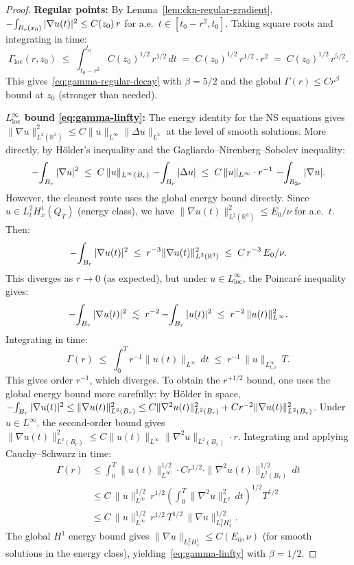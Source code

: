 \documentclass[11pt]{article}
\theoremstyle{definition}
\theoremstyle{remark}
\newcommand{\R}{\mathbb{R}}
\newcommand{\grad}{\nabla}
\newcommand{\Xint}{\mathop{\mathchoice{\vcenter{\hbox{$\displaystyle-$}}}%
  {\vcenter{\hbox{$\textstyle-$}}}%
  {\vcenter{\hbox{$\scriptstyle-$}}}%
  {\vcenter{\hbox{$\scriptscriptstyle-$}}}}\!\int}
\begin{document}
\begin{proof}
\textbf{Regular points:} By Lemma~\ref{lem:ckn-regular-gradient},
$\Xint_{B_r(x_0)} |\grad u(t)|^2 \leq C(z_0)\, r$ for a.e.\
$t \in [t_0-r^2, t_0]$.  Taking square roots and integrating in time:
\[
  \Gamma_{\mathrm{loc}}(r, z_0)
  \;\leq\; \int_{t_0-r^2}^{t_0} C(z_0)^{1/2}\, r^{1/2}\, dt
  \;=\; C(z_0)^{1/2}\, r^{1/2} \cdot r^2
  \;=\; C(z_0)^{1/2}\, r^{5/2}.
\]
This gives~\eqref{eq:gamma-regular-decay} with $\beta = 5/2$ and the global
$\Gamma(r) \leq Cr^\beta$ bound at $z_0$ (stronger than needed).

\textbf{$L^\infty_{\mathrm{loc}}$ bound \eqref{eq:gamma-linfty}:}
The energy identity for the NS equations gives
$\|\grad u\|_{L^2(\R^3)}^2 \leq C\|u\|_{L^\infty}\|\Delta u\|_{L^2}$
at the level of smooth solutions.  More directly, by H\"older's
inequality and the Gagliardo--Nirenberg--Sobolev inequality:
\[
  \Xint_{B_r} |\grad u|^2
  \;\leq\; C\,\|u\|_{L^\infty(B_r)}\,\Xint_{B_r}|\Delta u|
  \;\leq\; C\,\|u\|_{L^\infty}\cdot r^{-1}\,\Xint_{B_{2r}}|\grad u|.
\]
However, the cleanest route uses the global energy bound directly.
Since $u \in L^2_t H^1_x(Q_T)$ (energy class), we have
$\|\grad u(t)\|_{L^2(\R^3)}^2 \leq E_0/\nu$ for a.e.\ $t$.  Then:
\[
  \Xint_{B_r} |\grad u(t)|^2
  \;\leq\; r^{-3} \|\grad u(t)\|_{L^2(\R^3)}^2
  \;\leq\; C\, r^{-3}\, E_0/\nu.
\]
This diverges as $r \to 0$ (as expected), but under $u \in L^\infty_{\mathrm{loc}}$,
the Poincar\'e inequality gives:
\[
  \Xint_{B_r}|\grad u(t)|^2
  \;\lesssim\; r^{-2} \Xint_{B_r}|u(t)|^2
  \;\leq\; r^{-2}\,\|u(t)\|_{L^\infty}^2.
\]
Integrating in time:
\[
  \Gamma(r)
  \;\leq\; \int_0^T r^{-1}\|u(t)\|_{L^\infty}\,dt
  \;\leq\; r^{-1}\,\|u\|_{L^\infty_{t,x}}\,T.
\]
This gives order $r^{-1}$, which diverges.  To obtain the $r^{+1/2}$ bound,
one uses the global energy bound more carefully:
by H\"older in space,
$\Xint_{B_r}|\grad u(t)|^2 \leq \|\grad u(t)\|_{L^6(B_r)}^2
\leq C \|\grad^2 u(t)\|_{L^2(B_r)}^{2} + C r^{-2}\|\grad u(t)\|_{L^2(B_r)}^2$.
Under $u \in L^\infty$, the second-order bound gives
$\|\grad u(t)\|_{L^2(B_r)}^2 \leq C\|u(t)\|_{L^\infty}\|\grad^2 u\|_{L^2(B_r)}\cdot r$.
Integrating and applying Cauchy--Schwarz in time:
\begin{align*}
  \Gamma(r)
  &\leq \int_0^T \|u(t)\|_{L^\infty}^{1/2} \cdot C r^{1/2}
    \cdot \|\grad^2 u(t)\|_{L^2(B_r)}^{1/2}\,dt \\
  &\leq C\,\|u\|_{L^\infty}^{1/2}\,r^{1/2}
    \left(\int_0^T \|\grad^2 u\|_{L^2}^2\,dt\right)^{\!1/2} T^{1/2} \\
  &\leq C\,\|u\|_{L^\infty}^{1/2}\,r^{1/2}\,T^{1/2}\,\|\grad u\|_{L^2_t H^1_x}^{1/2}.
\end{align*}
The global $H^1$ energy bound gives $\|\grad u\|_{L^2_t H^1_x} \leq C(E_0,\nu)$
(for smooth solutions in the energy class), yielding~\eqref{eq:gamma-linfty}
with $\beta = 1/2$.
\end{proof}
\end{document}
